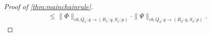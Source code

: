 \documentclass[11pt]{article}
\newcommand{\jk}[1]{\textcolor{cyan}{JK:~#1}}
\DeclareMathOperator{\id}{id}
\newcommand{\1}{\ensuremath{\mathbbm{1}}}
\theoremstyle{newdefinition}
\theoremstyle{newplain}
\theoremstyle{myplain}
\begin{document}
\begin{proof}[Proof of \cref{thm:mainchainrule}]
\begin{align}
\leq \|\Phi\|_{cb,Q_1:q\to(R_1:q,S_1:p)} \cdot \|\Psi\|_{cb,Q_2:q\to(R_2:q,S_2:p)}.
\end{align} 


\end{proof}
\end{document}
